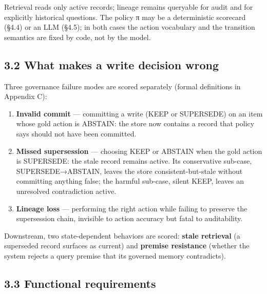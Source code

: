 Retrieval reads only active records; lineage remains queryable for audit
and for explicitly historical questions. The policy π may be a
deterministic scorecard (§4.4) or an LLM (§4.5); in both cases the
action vocabulary and the transition semantics are fixed by code, not by
the model.

\subsection{3.2 What makes a write decision
wrong}\label{what-makes-a-write-decision-wrong}

Three governance failure modes are scored separately (formal definitions
in Appendix C):

\begin{enumerate}
\def\labelenumi{\arabic{enumi}.}
\item
  \textbf{Invalid commit} --- committing a write (KEEP or SUPERSEDE) on
  an item whose gold action is ABSTAIN: the store now contains a record
  that policy says should not have been committed.
\item
  \textbf{Missed supersession} --- choosing KEEP or ABSTAIN when the
  gold action is SUPERSEDE: the stale record remains active. Its
  conservative sub-case, SUPERSEDE→ABSTAIN, leaves the store
  consistent-but-stale without committing anything false; the harmful
  sub-case, silent KEEP, leaves an unresolved contradiction active.
\item
  \textbf{Lineage loss} --- performing the right action while failing to
  preserve the supersession chain, invisible to action accuracy but
  fatal to auditability.
\end{enumerate}

Downstream, two state-dependent behaviors are scored: \textbf{stale
retrieval} (a superseded record surfaces as current) and \textbf{premise
resistance} (whether the system rejects a query premise that its
governed memory contradicts).

\subsection{3.3 Functional requirements}\label{functional-requirements}

